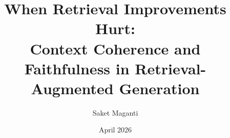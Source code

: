 \documentclass[12pt]{article}
\title{\LARGE\bfseries When Retrieval Improvements Hurt:\\[0.3em]
Context Coherence and Faithfulness in Retrieval-Augmented Generation}
\author{
  Saket Maganti
}
\date{April 2026}
\begin{document}
\maketitle

\begin{abstract}

\end{abstract}




















\end{document}
